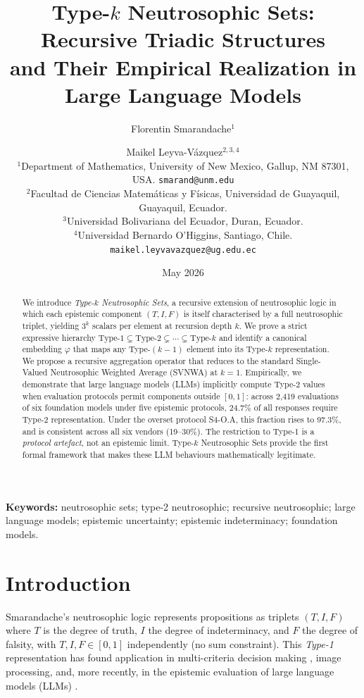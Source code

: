\documentclass[10pt,a4paper]{article}
\title{\textbf{Type-$k$ Neutrosophic Sets: Recursive Triadic Structures\\
and Their Empirical Realization in Large Language Models}}
\author{
  Florentin Smarandache$^{1}$ \and Maikel Leyva-V\'{a}zquez$^{2,3,4}$\\[6pt]
  \small $^{1}$Department of Mathematics, University of New Mexico,
  Gallup, NM 87301, USA. \texttt{smarand@unm.edu}\\
  \small $^{2}$Facultad de Ciencias Matem\'{a}ticas y F\'{i}sicas,
  Universidad de Guayaquil, Guayaquil, Ecuador.\\
  \small $^{3}$Universidad Bolivariana del Ecuador, Duran, Ecuador.\\
  \small $^{4}$Universidad Bernardo O'Higgins, Santiago, Chile.\\
  \small \texttt{maikel.leyvavazquez@ug.edu.ec}
}
\date{May 2026}
\begin{document}
\maketitle

\begin{abstract}
We introduce \emph{Type-$k$ Neutrosophic Sets}, a recursive extension
of neutrosophic logic in which each epistemic component $(T, I, F)$
is itself characterised by a full neutrosophic triplet, yielding
$3^k$ scalars per element at recursion depth $k$.
We prove a strict expressive hierarchy
$\text{Type-1} \subsetneq \text{Type-2} \subsetneq \cdots \subsetneq \text{Type-}k$
and identify a canonical embedding $\varphi$ that maps any
Type-$(k-1)$ element into its Type-$k$ representation.
We propose a recursive aggregation operator that reduces to the
standard Single-Valued Neutrosophic Weighted Average (SVNWA)
at $k=1$. Empirically, we demonstrate that large language models
(LLMs) implicitly compute Type-2 values when evaluation protocols
permit components outside $[0,1]$: across 2,419 evaluations of
six foundation models under five epistemic protocols,
24.7\% of all responses require Type-2 representation.
Under the overset protocol S4-O.A, this fraction rises to
97.3\%, and is consistent across all six vendors (19--30\%).
The restriction to Type-1 is a \emph{protocol artefact}, not an
epistemic limit. Type-$k$ Neutrosophic Sets provide the first formal
framework that makes these LLM behaviours mathematically legitimate.
\end{abstract}

\textbf{Keywords:} neutrosophic sets; type-2 neutrosophic;
recursive neutrosophic; large language models; epistemic uncertainty;
epistemic indeterminacy; foundation models.

\section{Introduction}

Smarandache's neutrosophic logic \cite{smarandache1998neutrosophy}
represents propositions as triplets $(T, I, F)$ where $T$ is the
degree of truth, $I$ the degree of indeterminacy, and $F$ the degree
of falsity, with $T, I, F \in [0,1]$ independently (no sum
constraint). This \emph{Type-1} representation has found application
in multi-criteria decision making \cite{wang2010svn}, image
processing, and, more recently, in the epistemic evaluation of large
language models (LLMs) \cite{mason2026tensors,
leyvavazquez2026plithogenic}.
\end{document}
